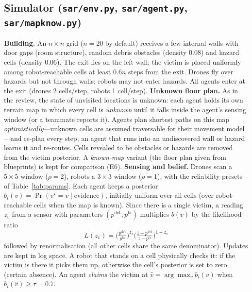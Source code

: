 \documentclass{article}
\begin{document}
\subsection{Simulator (\texttt{sar/env.py}, \texttt{sar/agent.py}, \texttt{sar/mapknow.py})}
\textbf{Building.} An $n\times n$ grid ($n=20$ by default) receives a few internal walls with door gaps (room
structure), random debris obstacles (density 0.08) and hazard cells (density 0.06). The exit lies on the left wall; the
victim is placed uniformly among robot-reachable cells at least $0.6n$ steps from the exit. Drones fly over hazards but
not through walls; robots may not enter hazards. All agents enter at the exit (drones 2 cells/step, robots 1
cell/step).
\textbf{Unknown floor plan.} As in the review, the state of unvisited locations is unknown: each agent holds its own
terrain map in which every cell is \emph{unknown} until it falls inside the agent's sensing window (or a teammate reports
it). Agents plan shortest paths on this map \emph{optimistically}---unknown cells are assumed traversable for their
movement model---and re-plan every step; an agent that runs into an undiscovered wall or hazard learns it and re-routes.
Cells revealed to be obstacles or hazards are removed from the victim posterior. A \emph{known-map} variant (the floor
plan given from blueprints) is kept for comparison (E6).
\textbf{Sensing and belief.} Drones scan a $5\times5$ window ($\rho=2$), robots a $3\times3$ window ($\rho=1$), with the
reliability presets of Table~\ref{tab:params}. Each agent keeps a posterior $b_i(v)=\Pr(v^\star=v\mid\text{evidence})$,
initially uniform over all cells (over robot-reachable cells when the map is known). Since there is a single victim, a reading $z_v$ from a sensor with
parameters $(p^{\mathrm{det}},p^{\mathrm{fa}})$ multiplies $b(v)$ by the likelihood ratio
\begin{equation}
L(z_v)=\Big(\tfrac{p^{\mathrm{det}}}{p^{\mathrm{fa}}}\Big)^{z_v}\Big(\tfrac{1-p^{\mathrm{det}}}{1-p^{\mathrm{fa}}}\Big)^{1-z_v}
\label{eq:bayes}
\end{equation}
followed by renormalisation (all other cells share the same denominator). Updates are kept in log space. A robot that
stands on a cell physically checks it: if the victim is there it picks them up, otherwise the cell's posterior is set
to zero (certain absence). An agent \emph{claims} the victim at $\hat v=\arg\max_v b_i(v)$ when $b_i(\hat v)\ge\tau=0.7$.
\end{document}
